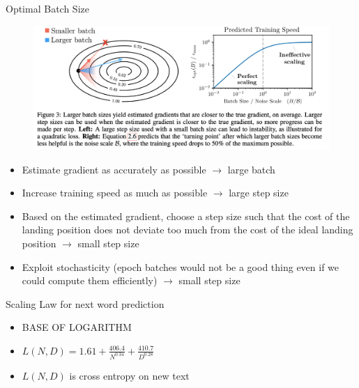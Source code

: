\begin{vbframe}{Optimal Batch Size}

\begin{figure}
    \centering
    \includegraphics{figure/optimalbatchsize.png}
\end{figure}

\begin{itemize}
    \item Estimate gradient as accurately as possible $\rightarrow$ large batch
    \item Increase training speed as much as possible $\rightarrow$ large step size
    \item Based on the estimated gradient, choose a step size such that the cost of the landing position does not deviate too much from the cost of the ideal landing position $\rightarrow$ small step size
    \item Exploit stochasticity (epoch batches would not be a good thing even if we could compute them efficiently) $\rightarrow$ small step size

\end{itemize}

\end{vbframe}


\begin{vbframe}{Scaling Law for next word prediction}

\vfill

\begin{itemize}
\item BASE OF LOGARITHM
    \item $L(N,D) = 1.61 + \frac{406.4}{N^{0.34}} + \frac{410.7}{D^{0.28}}$
    \item $L(N,D)$ is cross entropy on new text
\end{itemize}

\vfill

\end{vbframe}


